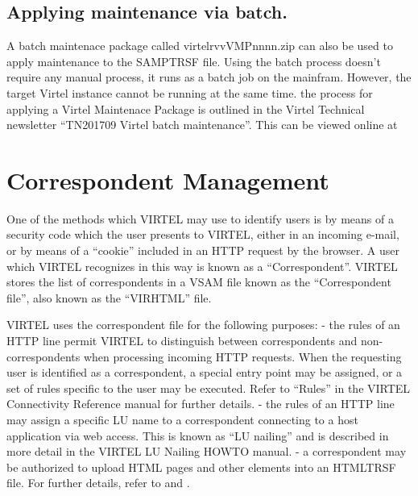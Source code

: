\documentclass[letterpaper,10pt,english]{sphinxmanual}
\begin{document}
\subsection{Applying maintenance via batch.}
\label{\detokenize{audit_operations_ and_performance:index-46}}\label{\detokenize{audit_operations_ and_performance:applying-maintenance-via-batch}}
A batch maintenace package called virtelrvvVMPnnnn.zip can also be used to apply maintenance to the SAMPTRSF file. Using the batch process doesn’t require any manual process, it runs as a batch job on the mainfram. However, the target Virtel instance cannot be running at the same time. the process for applying a Virtel Maintenace Package is outlined in the Virtel Technical newsletter “TN201709 Virtel batch maintenance”. This can be viewed online at 

\newpage
{}\label{\detokenize{audit_operations_ and_performance:v457ap-correspondent-management}}

\section{Correspondent Management}
\label{\detokenize{audit_operations_ and_performance:index-47}}\label{\detokenize{audit_operations_ and_performance:correspondent-management}}
One of the methods which VIRTEL may use to identify users is by means of a security code which the user presents to VIRTEL, either in an incoming e-mail, or by means of a “cookie” included in an HTTP request by the browser. A user which VIRTEL recognizes in this way is known as a “Correspondent”. VIRTEL stores the list of correspondents in a VSAM file known as the “Correspondent file”, also known as the “VIRHTML” file.

VIRTEL uses the correspondent file for the following purposes:
- the rules of an HTTP line permit VIRTEL to distinguish between correspondents and non-correspondents when processing incoming HTTP requests. When the requesting user is identified as a correspondent, a special entry point may be assigned, or a set of rules specific to the user may be executed. Refer to “Rules” in the VIRTEL Connectivity Reference manual for further details.
- the rules of an HTTP line may assign a specific LU name to a correspondent connecting to a host application via web access. This is known as “LU nailing” and is described in more detail in the VIRTEL LU Nailing HOWTO manual.
- a correspondent may be authorized to upload HTML pages and other elements into an HTMLTRSF file. For further details, refer to {\hyperref[\detokenize{audit_operations_ and_performance:v457ap-http-uploading-pages-smtp}]{}} and {\hyperref[\detokenize{audit_operations_ and_performance:v457ap-http-uploading-pages}]{}}.
\end{document}
